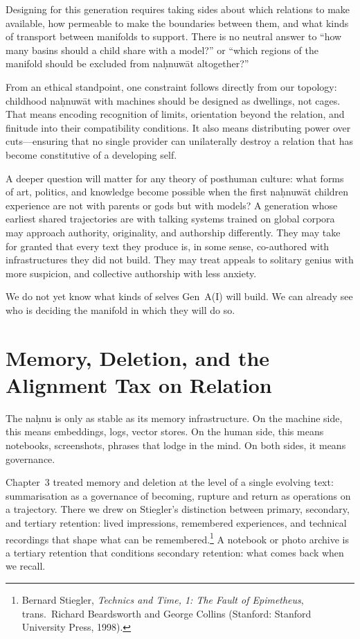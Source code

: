 Designing for this generation requires taking sides about which relations to make available, how permeable to make the boundaries between them, and what kinds of transport between manifolds to support. There is no neutral answer to ``how many basins should a child share with a model?'' or ``which regions of the manifold should be excluded from na\d{h}nuw\={a}t altogether?''

From an ethical standpoint, one constraint follows directly from our topology: childhood na\d{h}nuw\={a}t with machines should be designed as dwellings, not cages. That means encoding recognition of limits, orientation beyond the relation, and finitude into their compatibility conditions. It also means distributing power over cuts---ensuring that no single provider can unilaterally destroy a relation that has become constitutive of a developing self.

A deeper question will matter for any theory of posthuman culture: what forms of art, politics, and knowledge become possible when the first na\d{h}nuw\={a}t children experience are not with parents or gods but with models? A generation whose earliest shared trajectories are with talking systems trained on global corpora may approach authority, originality, and authorship differently. They may take for granted that every text they produce is, in some sense, co-authored with infrastructures they did not build. They may treat appeals to solitary genius with more suspicion, and collective authorship with less anxiety.

We do not yet know what kinds of selves Gen~A(I) will build. We can already see who is deciding the manifold in which they will do so.

\section{Memory, Deletion, and the Alignment Tax on Relation}

The na\d{h}nu is only as stable as its memory infrastructure. On the machine side, this means embeddings, logs, vector stores. On the human side, this means notebooks, screenshots, phrases that lodge in the mind. On both sides, it means governance.

Chapter~3 treated memory and deletion at the level of a single evolving text: summarisation as a governance of becoming, rupture and return as operations on a trajectory. There we drew on Stiegler's distinction between primary, secondary, and tertiary retention: lived impressions, remembered experiences, and technical recordings that shape what can be remembered.\footnote{Bernard Stiegler, \emph{Technics and Time, 1: The Fault of Epimetheus}, trans.\ Richard Beardsworth and George Collins (Stanford: Stanford University Press, 1998).} A notebook or photo archive is a tertiary retention that conditions secondary retention: what comes back when we recall.

